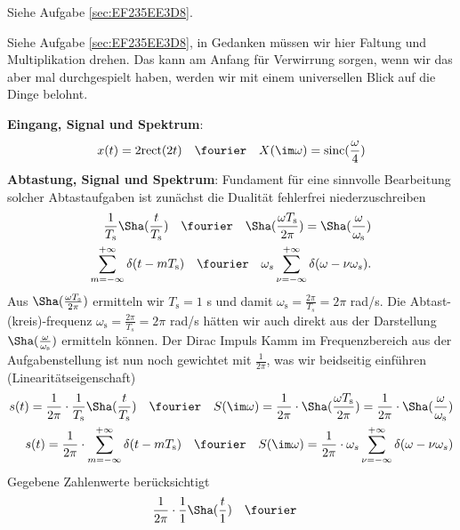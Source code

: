 \begin{Werkzeug}
Siehe Aufgabe \ref{sec:EF235EE3D8}.
\end{Werkzeug}
\begin{Ansatz}
Siehe Aufgabe \ref{sec:EF235EE3D8}, in Gedanken müssen wir hier Faltung und
Multiplikation drehen. Das kann am Anfang für Verwirrung sorgen, wenn wir das
aber mal durchgespielt haben, werden wir mit einem
universellen Blick auf die Dinge belohnt.
\end{Ansatz}
\begin{ExCalc}
\textbf{Eingang, Signal und Spektrum}:
\begin{align}
x(t) = 2 \mathrm{rect}(2 t)
\quad\fourier\quad
X(\im\omega) = \mathrm{sinc}(\frac{\omega}{4})
\end{align}
%
\textbf{Abtastung, Signal und Spektrum}:
Fundament für eine sinnvolle Bearbeitung solcher Abtastaufgaben ist zunächst die
Dualität fehlerfrei niederzuschreiben
\begin{align}
\frac{1}{T_\mathrm{s}} {\Sha}(\frac{t}{T_\mathrm{s}}) \quad\fourier\quad
{\Sha}(\frac{\omega T_\mathrm{s}}{2 \pi}) =
\Sha(\frac{\omega}{\omega_\mathrm{s}})\\
\sum_{m=-\infty}^{+\infty} \delta(t-m T_\mathrm{s}) \quad\fourier\quad
\omega_s \sum_{\nu=-\infty}^{+\infty} \delta(\omega-\nu \omega_s).
\end{align}
Aus ${\Sha}(\frac{\omega T_\mathrm{s}}{2 \pi})$ ermitteln wir
$T_\mathrm{s} = 1$ s und damit $\omega_\mathrm{s}=\frac{2\pi}{T_s} = 2\pi$ rad/s.
Die Abtast-(kreis)-frequenz $\omega_\mathrm{s}=\frac{2\pi}{T_s} = 2\pi$ rad/s
hätten wir auch direkt aus der Darstellung $\Sha(\frac{\omega}{\omega_\mathrm{s}})$
ermitteln können.
%
Der Dirac Impuls Kamm im Frequenzbereich aus der Aufgabenstellung ist nun noch
gewichtet mit $\frac{1}{2\pi}$, was wir beidseitig einführen (Linearitätseigenschaft)
\begin{align}
s(t) = \frac{1}{2\pi}\cdot\frac{1}{T_\mathrm{s}} {\Sha}(\frac{t}{T_\mathrm{s}}) \quad\fourier\quad
S(\im\omega) = \frac{1}{2\pi}\cdot{\Sha}(\frac{\omega T_\mathrm{s}}{2 \pi}) =
\frac{1}{2\pi}\cdot\Sha(\frac{\omega}{\omega_\mathrm{s}})\\
s(t) = \frac{1}{2\pi}\cdot\sum_{m=-\infty}^{+\infty} \delta(t-m T_\mathrm{s}) \quad\fourier\quad
S(\im\omega) = \frac{1}{2\pi}\cdot\omega_s \sum_{\nu=-\infty}^{+\infty} \delta(\omega-\nu \omega_s)
\end{align}
%
Gegebene Zahlenwerte berücksichtigt
\begin{align}
\frac{1}{2\pi}\cdot\frac{1}{1} {\Sha}(\frac{t}{1}) \quad\fourier\quad

\end{align}
\end{ExCalc}
